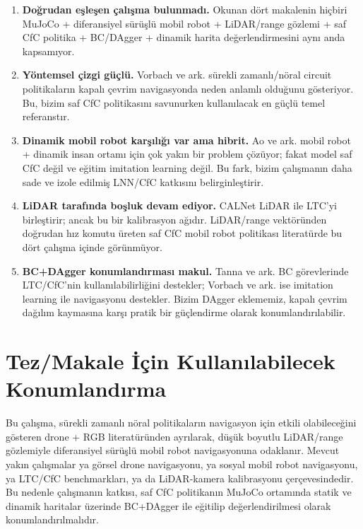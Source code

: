 \documentclass[11pt,a4paper]{article}
\begin{document}
\begin{enumerate}
  \item \textbf{Doğrudan eşleşen çalışma bulunmadı.} Okunan dört makalenin hiçbiri
  MuJoCo + diferansiyel sürüşlü mobil robot + LiDAR/range gözlemi + saf CfC
  politika + BC/DAgger + dinamik harita değerlendirmesini aynı anda kapsamıyor.

  \item \textbf{Yöntemsel çizgi güçlü.} Vorbach ve ark. sürekli zamanlı/nöral
  circuit politikaların kapalı çevrim navigasyonda neden anlamlı olduğunu
  gösteriyor. Bu, bizim saf CfC politikasını savunurken kullanılacak en güçlü
  temel referanstır.

  \item \textbf{Dinamik mobil robot karşılığı var ama hibrit.} Ao ve ark. mobil
  robot + dinamik insan ortamı için çok yakın bir problem çözüyor; fakat model
  saf CfC değil ve eğitim imitation learning değil. Bu fark, bizim çalışmanın
  daha sade ve izole edilmiş LNN/CfC katkısını belirginleştirir.

  \item \textbf{LiDAR tarafında boşluk devam ediyor.} CALNet LiDAR ile LTC'yi
  birleştirir; ancak bu bir kalibrasyon ağıdır. LiDAR/range vektöründen doğrudan
  hız komutu üreten saf CfC mobil robot politikası literatürde bu dört çalışma
  içinde görünmüyor.

  \item \textbf{BC+DAgger konumlandırması makul.} Tanna ve ark. BC görevlerinde
  LTC/CfC'nin kullanılabilirliğini destekler; Vorbach ve ark. ise imitation
  learning ile navigasyonu destekler. Bizim DAgger eklememiz, kapalı çevrim
  dağılım kaymasına karşı pratik bir güçlendirme olarak konumlandırılabilir.
\end{enumerate}

\section{Tez/Makale İçin Kullanılabilecek Konumlandırma}

Bu çalışma, sürekli zamanlı nöral politikaların navigasyon için etkili
olabileceğini gösteren drone + RGB literatüründen ayrılarak, düşük boyutlu
LiDAR/range gözlemiyle diferansiyel sürüşlü mobil robot navigasyonuna odaklanır.
Mevcut yakın çalışmalar ya görsel drone navigasyonu, ya sosyal mobil robot
navigasyonu, ya LTC/CfC benchmarkları, ya da LiDAR-kamera kalibrasyonu
çerçevesindedir. Bu nedenle çalışmanın katkısı, saf CfC politikanın MuJoCo
ortamında statik ve dinamik haritalar üzerinde BC+DAgger ile eğitilip
değerlendirilmesi olarak konumlandırılmalıdır.
\end{document}
